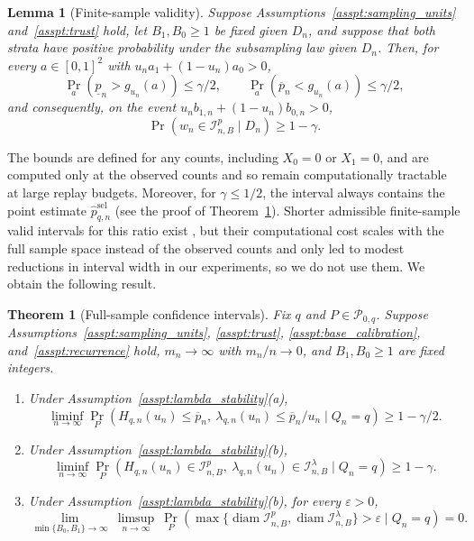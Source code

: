 \documentclass[10pt]{article}
\newtheorem{theorem}{Theorem}
\newtheorem{lemma}{Lemma}
\begin{document}
\begin{lemma}[Finite-sample validity]\label{lem:exact_ci}
Suppose Assumptions~\ref{asspt:sampling_units} and~\ref{asspt:trust} hold, let $B_1,B_0\ge1$ be fixed given $D_n$, and suppose that both strata have positive probability under the subsampling law given $D_n$. Then, for every $a\in[0,1]^2$ with $u_na_1+(1-u_n)a_0>0$,
\begin{equation} \label{eq:finite-sample-validity}
\Pr_a(\underline p_n>g_{u_n}(a))\le\gamma/2,
\qquad
\Pr_a(\overline p_n<g_{u_n}(a))\le\gamma/2,
\end{equation}
and consequently, on the event $u_nb_{1,n}+(1-u_n)b_{0,n}>0$,
\begin{equation} \label{eq:finite-sample-coverage}
\Pr(w_n\in\mathcal I^p_{n,B}\mid D_n)\ge1-\gamma .
\end{equation}
\end{lemma}

The bounds are defined for any counts, including $X_0=0$ or $X_1=0$, and are computed only at the observed counts and so remain computationally tractable at large replay budgets. Moreover, for $\gamma\le1/2$, the interval always contains the point estimate $\widehat p^{\mathrm{sel}}_{q,n}$ (see the proof of Theorem~\ref{thm:replay_confidence}). Shorter admissible finite-sample valid intervals for this ratio exist \citep{wang2015exact}, but their computational cost scales with the full sample space instead of the observed counts and only led to modest reductions in interval width in our experiments, so we do not use them.
We obtain the following result.

\begin{theorem}[Full-sample confidence intervals]
\label{thm:replay_confidence}
Fix $q$ and $P\in\mathcal P_{0,q}$. Suppose Assumptions~\ref{asspt:sampling_units}, \ref{asspt:trust}, \ref{asspt:base_calibration}, and~\ref{asspt:recurrence} hold, $m_n\to\infty$ with $m_n/n\to0$, and $B_1,B_0\ge1$ are fixed integers.
\begin{enumerate}[label=(\alph*)]
\item Under Assumption~\ref{asspt:lambda_stability}(a),
\[
\liminf_{n\to\infty}\Pr_P\!\left(
H_{q,n}(u_n)\le\overline p_n,\
\lambda_{q,n}(u_n)\le\overline p_n/u_n
\mid Q_n=q\right)\ge1-\gamma/2 .
\]
\item Under Assumption~\ref{asspt:lambda_stability}(b),
\[
\liminf_{n\to\infty}\Pr_P\!\left(
H_{q,n}(u_n)\in\mathcal I^{p}_{n,B},\
\lambda_{q,n}(u_n)\in\mathcal I^{\lambda}_{n,B}
\mid Q_n=q\right)\ge1-\gamma .
\]
\item Under Assumption~\ref{asspt:lambda_stability}(b), for every $\varepsilon>0$,
\begin{equation}
\label{eq:replay_ci_precision}
\lim_{\min\{B_0,B_1\}\to\infty}\
\limsup_{n\to\infty}\
\Pr_P\!\left(
\max\big\{
\operatorname{diam}\mathcal I^{p}_{n,B},
\operatorname{diam}\mathcal I^{\lambda}_{n,B}
\big\}>\varepsilon
\mid Q_n=q
\right)=0 .
\end{equation}
\end{enumerate}
\end{theorem}
\end{document}

